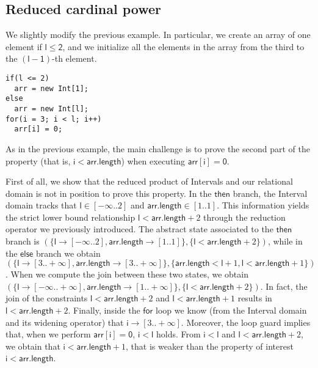 \documentclass[submission,copyright,creativecommons]{eptcs}
\newcommand{\statement}[1]{\ensuremath{\mathsf{#1}}}
\begin{document}
\subsection{Reduced cardinal power}
We slightly modify the previous example. In particular, we create an array of one element if $\statement{l \leq 2}$, and we initialize all the elements in the array from the third to the $\statement{(l-1)}$-th element.

\begin{lstlisting}
if(l <= 2)
  arr = new Int[1];
else 
  arr = new Int[l];
for(i = 3; i < l; i++)
  arr[i] = 0;
\end{lstlisting}

As in the previous example, the main challenge is to prove the second part of the property (that is, $\statement{i} < \statement{arr.length}$) when executing \statement{arr[i]=0}.

First of all, we show that the reduced product of Intervals and our relational domain is not in position to prove this property.
In the \statement{then} branch, the Interval domain tracks that $\statement{l} \in [-\infty .. 2]$ and $\statement{arr.length} \in [1 .. 1]$. This information yields the strict lower bound relationship $\statement{l} < \statement{arr.length} + 2$ through the reduction operator we previously introduced. The abstract state associated to the \statement{then} branch is $(\{ \statement{l} \rightarrow [-\infty .. 2], \statement{arr.length} \rightarrow [1 .. 1] \}, \{ \statement{l} < \statement{arr.length} + 2\})$, while in the \statement{else} branch we obtain $(\{ \statement{l} \rightarrow [3 .. +\infty], \statement{arr.length} \rightarrow [3 .. +\infty] \}, \{ \statement{arr.length} < \statement{l} + 1, \statement{l} < \statement{arr.length} + 1 \})$. When we compute the join between these two states, we obtain $( \{ \statement{l} \rightarrow [-\infty .. +\infty], \statement{arr.length} \rightarrow [1 .. +\infty] \}, \{ \statement{l} < \statement{arr.length} + 2 \})$. In fact, the join of the constraints $ \statement{l} < \statement{arr.length} + 2$ and $\statement{l} < \statement{arr.length} + 1$ results in $\statement{l} < \statement{arr.length} + 2$. Finally, inside the \statement{for} loop we know (from the Interval domain and its widening operator) that $\statement{i} \rightarrow [3 .. +\infty]$. Moreover, the loop guard implies that, when we perform \statement{arr[i]=0}, $\statement{i} < \statement{l}$ holds. From $\statement{i} < \statement{l}$ and $\statement{l} < \statement{arr.length} + 2$, we obtain that $\statement{i} < \statement{arr.length} + 1$, that is weaker than the property of interest $\statement{i} < \statement{arr.length}$.
\end{document}

